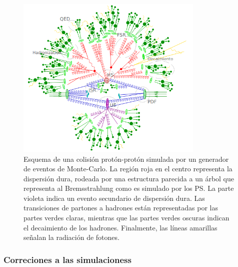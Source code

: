 \begin{figure}
  \centering
  \includegraphics[width=0.8\textwidth]{images/mc_simulation.png}
  \caption{Esquema de una colisión protón-protón simulada por un generador de
eventos de Monte-Carlo. La región roja en el centro representa la dispersión dura,
rodeada por una estructura parecida a un árbol que representa al Bremsstrahlung
como es simulado por los PS. La parte violeta indica un evento secundario 
de dispersión dura. Las transiciones de partones a hadrones están representadas
por las partes verdes claras, mientras que las partes verdes oscuras indican el 
decaimiento de los hadrones. Finalmente, las líneas amarillas señalan la radiación de
fotones\cite{mc_simulation}. }
\end{figure}

\subsubsection{Correciones a las simulacioness}



